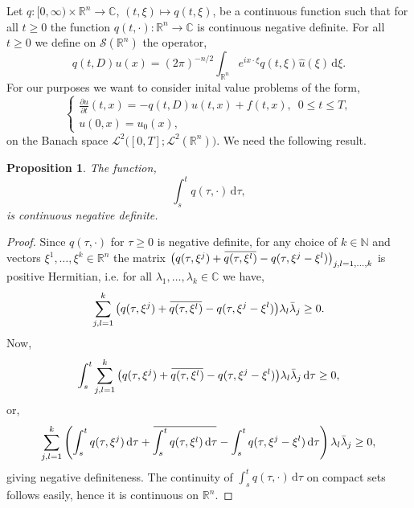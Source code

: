 \documentclass[a4paper, 12pt]{report}
\theoremstyle{cor}
\newtheorem{prop}[theorem]{Proposition}
\theoremstyle{remark}
\theoremstyle{definition}
\newcommand{\overbar}[1]{\mkern 1.5mu\overline{\mkern-1.5mu#1\mkern-1.5mu}\mkern 1.5mu}
\begin{document}
Let $q : [0, \infty) \times \mathbb{R}^n \to \mathbb{C}$, $(t, \xi) \mapsto q(t, \xi)$, be a continuous function such that for all $t \ge 0$ the function $q(t, \cdot) : \mathbb{R}^n \to \mathbb{C}$ is continuous negative definite.  For all $t \ge 0$ we define on $\mathcal{S}(\mathbb{R}^n)$ the operator,
\begin{equation}
q(t, D)u(x) = (2\pi)^{-n/2}\int_{\mathbb{R}^n}e^{ix\cdot\xi}q(t, \xi)\hat{u}(\xi)\,\mathrm{d}\xi.
\end{equation}
For our purposes we want to consider inital value problems of the form,
\begin{equation}\label{IVPP}
\begin{cases}
\frac{\partial u}{\partial t}(t, x) = -q(t, D)u(t, x) + f(t, x), \,\,\, 0 \le t \le T,\\
u(0, x) = u_0(x),
\end{cases}
\end{equation}
on the Banach space $\mathcal{L}^2\big([0, T]; \mathcal{L}^2(\mathbb{R}^n)\big)$.  We need the following result.
\begin{prop}\label{TDSFSP1}
The function,
$$
\int_s^tq(\tau, \cdot)\,\mathrm{d}\tau,
$$
is continuous negative definite.
\end{prop}
\begin{proof}
Since $q(\tau, \cdot)$ for $\tau \ge 0$ is negative definite, for any choice of $k \in \mathbb{N}$ and vectors $\xi^1, \dots, \xi^k \in \mathbb{R}^n$ the matrix $\big(q(\tau, \xi^j) + \overbar{q(\tau, \xi^l)} - q(\tau, \xi^j - \xi^l)\big)_{j, l = 1, \dots, k}$ is positive Hermitian, i.e. for all $\lambda_1, \dots, \lambda_k \in \mathbb{C}$ we have,
$$
\sum_{j, l = 1}^k\big(q(\tau, \xi^j) + \overbar{q(\tau, \xi^l)} - q(\tau, \xi^j - \xi^l)\big)\lambda_l\bar{\lambda}_j \ge 0.
$$
Now,
$$
\int_s^t\sum_{j, l = 1}^k\big(q(\tau, \xi^j) + \overbar{q(\tau, \xi^l)} - q(\tau, \xi^j - \xi^l)\big)\lambda_l\bar{\lambda}_j\,\mathrm{d}\tau \ge 0,
$$
or,
$$
\sum_{j, l = 1}^k\left(\int_s^tq(\tau, \xi^j)\,\mathrm{d}\tau + \overbar{\int_s^tq(\tau, \xi^l)\,\mathrm{d}\tau} - \int_s^tq(\tau, \xi^j - \xi^l)\,\mathrm{d}\tau\right)\lambda_l\bar{\lambda}_j \ge 0,
$$
giving negative definiteness.  The continuity of $\int_s^tq(\tau, \cdot)\,\mathrm{d}\tau$ on compact sets follows easily, hence it is continuous on $\mathbb{R}^n$.
\end{proof}
\end{document}
